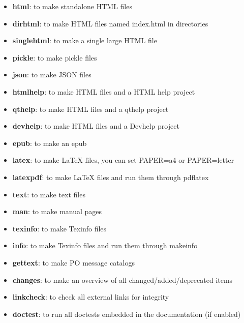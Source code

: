 \documentclass[a4paper,11pt,oneside]{sphinxmanual}
\begin{document}
\begin{itemize}
\item {} 
\textbf{html}: to make standalone HTML files

\item {} 
\textbf{dirhtml}: to make HTML files named index.html in directories

\item {} 
\textbf{singlehtml}: to make a single large HTML file

\item {} 
\textbf{pickle}: to make pickle files

\item {} 
\textbf{json}: to make JSON files

\item {} 
\textbf{htmlhelp}: to make HTML files and a HTML help project

\item {} 
\textbf{qthelp}: to make HTML files and a qthelp project

\item {} 
\textbf{devhelp}: to make HTML files and a Devhelp project

\item {} 
\textbf{epub}: to make an epub

\item {} 
\textbf{latex}: to make LaTeX files, you can set PAPER=a4 or PAPER=letter

\item {} 
\textbf{latexpdf}: to make LaTeX files and run them through pdflatex

\item {} 
\textbf{text}: to make text files

\item {} 
\textbf{man}: to make manual pages

\item {} 
\textbf{texinfo}: to make Texinfo files

\item {} 
\textbf{info}: to make Texinfo files and run them through makeinfo

\item {} 
\textbf{gettext}: to make PO message catalogs

\item {} 
\textbf{changes}: to make an overview of all changed/added/deprecated items

\item {} 
\textbf{linkcheck}: to check all external links for integrity

\item {} 
\textbf{doctest}: to run all doctests embedded in the documentation (if enabled)

\end{itemize}
\end{document}
